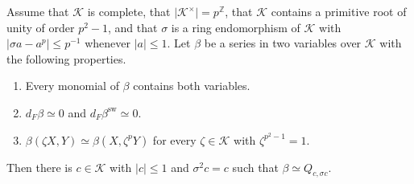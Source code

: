 \begin{theorem}\label{thm:betaisg}
Assume that $\mathcal K$ is complete, that $\lvert\mathcal K^\times\rvert=p^{\mathbb Z}$, that $\mathcal K$ contains a primitive root of unity of order $p^2-1$, and that $\sigma$ is a ring endomorphism of $\mathcal K$ with $\lvert\sigma a-a^p\rvert\le p^{-1}$ whenever $\lvert a\rvert\le1$. Let $\beta$ be a series in two variables over $\mathcal K$ with the following properties.
\begin{enumerate}
\item[(i)] Every monomial of $\beta$ contains both variables.
\item[(ii)] $d_F\beta\simeq0$ and $d_F\beta^{\mathrm{sw}}\simeq0$.
\item[(iii)] $\beta(\zeta X,Y)\simeq\beta(X,\zeta^pY)$ for every $\zeta\in\mathcal K$ with $\zeta^{p^2-1}=1$.
\end{enumerate}
Then there is $c\in\mathcal K$ with $\lvert c\rvert\le1$ and $\sigma^2c=c$ such that $\beta\simeq Q_{c,\sigma c}$.
\end{theorem}

